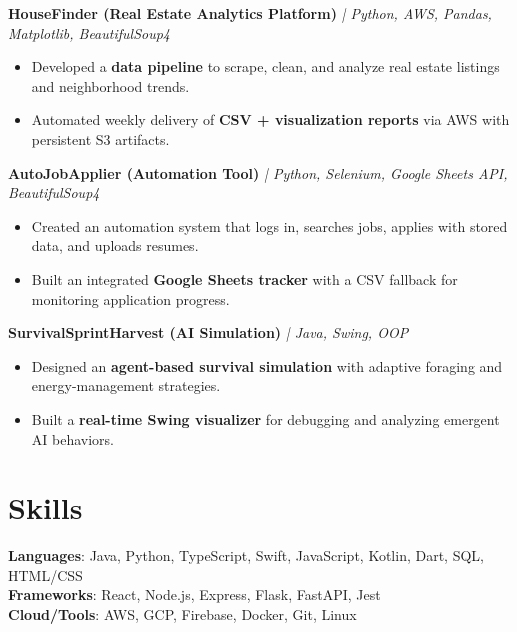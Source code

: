 \documentclass[8pt]{resume}
\begin{document}
\textbf{HouseFinder (Real Estate Analytics Platform)} \textit{| Python, AWS, Pandas, Matplotlib, BeautifulSoup4}
\begin{itemize}
    \item Developed a \textbf{data pipeline} to scrape, clean, and analyze real estate listings and neighborhood trends.
    \item Automated weekly delivery of \textbf{CSV + visualization reports} via AWS with persistent S3 artifacts.
\end{itemize}

\textbf{AutoJobApplier (Automation Tool)} \textit{| Python, Selenium, Google Sheets API, BeautifulSoup4}
\begin{itemize}
    \item Created an automation system that logs in, searches jobs, applies with stored data, and uploads resumes.
    \item Built an integrated \textbf{Google Sheets tracker} with a CSV fallback for monitoring application progress.
\end{itemize}

\textbf{SurvivalSprintHarvest (AI Simulation)} \textit{| Java, Swing, OOP}
\begin{itemize}
    \item Designed an \textbf{agent-based survival simulation} with adaptive foraging and energy-management strategies.
    \item Built a \textbf{real-time Swing visualizer} for debugging and analyzing emergent AI behaviors.
\end{itemize}

\section{Skills}
\textbf{Languages}: Java, Python, TypeScript, Swift, JavaScript, Kotlin, Dart, SQL, HTML/CSS\\
\textbf{Frameworks}: React, Node.js, Express, Flask, FastAPI, Jest\\
\textbf{Cloud/Tools}: AWS, GCP, Firebase, Docker, Git, Linux\\
\end{document}
